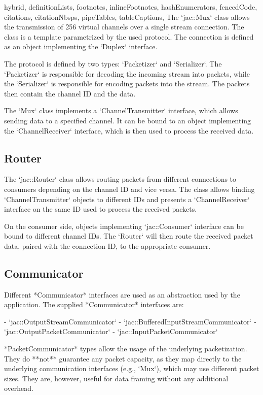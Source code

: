 \documentclass[
  digital,
  oneside,
  nosansbold,
  nocolorbold,
  lof,
  lot
]{fithesis4}
\begin{document}
\begin{markdown*}{%
  hybrid,
  definitionLists,
  footnotes,
  inlineFootnotes,
  hashEnumerators,
  fencedCode,
  citations,
  citationNbsps,
  pipeTables,
  tableCaptions,
}
The `jac::Mux` class allows the transmission of 256 virtual channels over a single stream connection. The class is a template parametrized by the used protocol. The connection is defined as an object implementing the `Duplex` interface.

The protocol is defined by two types: `Packetizer` and `Serializer`. The `Packetizer` is responsible for decoding the incoming stream into packets, while the `Serializer` is responsible for encoding packets into the stream. The packets then contain the channel ID and the data.

The `Mux` class implements a `ChannelTransmitter` interface, which allows sending data to a specified channel. It can be bound to an object implementing the `ChannelReceiver` interface, which is then used to process the received data.

\subsection{Router}

The `jac::Router` class allows routing packets from different connections to consumers depending on the channel ID and vice versa. The class allows binding `ChannelTransmitter` objects to different IDs and presents a `ChannelReceiver` interface on the same ID used to process the received packets.

On the consumer side, objects implementing `jac::Consumer` interface can be bound to different channel IDs. The `Router` will then route the received packet data, paired with the connection ID, to the appropriate consumer.

\subsection{Communicator}

Different *Communicator* interfaces are used as an abstraction used by the application. The supplied *Communicator* interfaces are:

  - `jac::OutputStreamCommunicator`
  - `jac::BufferedInputStreamCommunicator`
  - `jac::OutputPacketCommunicator`
  - `jac::InputPacketCommunicator`

*PacketCommunicator* types allow the usage of the underlying packetization. They do **not** guarantee any packet capacity, as they map directly to the underlying communication interfaces (e.g., `Mux`), which may use different packet sizes. They are, however, useful for data framing without any additional overhead.


\end{markdown*}
\end{document}
